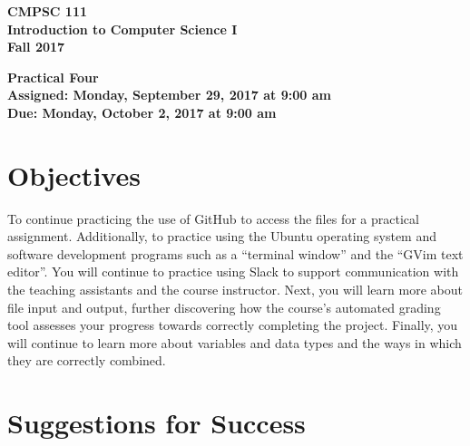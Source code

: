 \documentclass[11pt]{article}
\newcommand{\assignmentduedate}{October 2}
\newcommand{\assignmentassignedate}{September 29}
\newcommand{\assignmentnumber}{Four}
\newcommand{\labyear}{2017}
\newcommand{\labday}{Monday}
\newcommand{\labtime}{9:00 am}
\newcommand{\assigneddate}{Assigned: \labday, \assignmentassignedate, \labyear{} at \labtime{}}
\newcommand{\duedate}{Due: \labday, \assignmentduedate, \labyear{} at \labtime{}}
\newcommand{\labtitle}[1]
{
  \begin{center}
    \begin{center}
      \bf
      CMPSC 111\\Introduction to Computer Science I\\
      Fall 2017\\
      \medskip
    \end{center}
    \bf
    #1
  \end{center}
}
\begin{document}
\thispagestyle{empty}

\labtitle{Practical \assignmentnumber{} \\ \assigneddate{} \\ \duedate{}}

\section*{Objectives}

To continue practicing the use of GitHub to access the files for a practical assignment. Additionally, to practice using
the Ubuntu operating system and software development programs such as a ``terminal window'' and the ``GVim text
editor''. You will continue to practice using Slack to support communication with the teaching assistants and the course
instructor. Next, you will learn more about file input and output, further discovering how the course's automated
grading tool assesses your progress towards correctly completing the project. Finally, you will continue to learn more
about variables and data types and the ways in which they are correctly combined.

\section*{Suggestions for Success}
\end{document}
